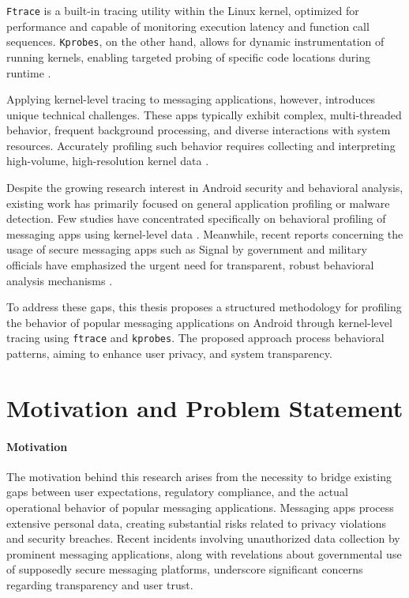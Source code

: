 \documentclass[a4paper,12pt]{report}
\begin{document}
\texttt{Ftrace} is a built-in tracing utility within the Linux kernel, optimized for performance and capable of monitoring execution latency and function call sequences. \texttt{Kprobes}, on the other hand, allows for dynamic instrumentation of running kernels, enabling targeted probing of specific code locations during runtime \cite{corbet2015drivers}.

Applying kernel-level tracing to messaging applications, however, introduces unique technical challenges. These apps typically exhibit complex, multi-threaded behavior, frequent background processing, and diverse interactions with system resources. Accurately profiling such behavior requires collecting and interpreting high-volume, high-resolution kernel data \cite{tang2017profiling, kim2016io}.

Despite the growing research interest in Android security and behavioral analysis, existing work has primarily focused on general application profiling or malware detection. Few studies have concentrated specifically on behavioral profiling of messaging apps using kernel-level data \cite{backes2015boxify}. Meanwhile, recent reports concerning the usage of secure messaging apps such as Signal by government and military officials have emphasized the urgent need for transparent, robust behavioral analysis mechanisms \cite{washingtonpost2023signal}.

To address these gaps, this thesis proposes a structured methodology for profiling the behavior of popular messaging applications on Android through kernel-level tracing using \texttt{ftrace} and \texttt{kprobes}. The proposed approach process behavioral patterns, aiming to enhance user privacy, and system transparency.

\section{Motivation and Problem Statement}
\paragraph{Motivation}
The motivation behind this research arises from the necessity to bridge existing gaps between user expectations, regulatory compliance, and the actual operational behavior of popular messaging applications. Messaging apps process extensive personal data, creating substantial risks related to privacy violations and security breaches. Recent incidents involving unauthorized data collection by prominent messaging applications, along with revelations about governmental use of supposedly secure messaging platforms, underscore significant concerns regarding transparency and user trust.
\end{document}

